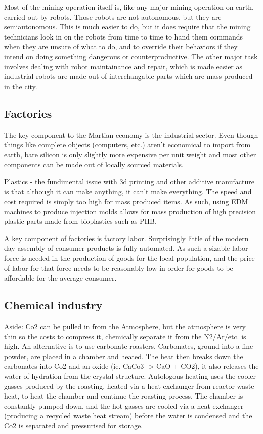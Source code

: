 \documentclass[10pt]{article}
\begin{document}
Most of the mining operation itself is, like any major mining operation on earth, carried out by robots. Those robots are not autonomous, but they are semiautonomous. This is much easier to do, but it does require that the mining technicians look in on the robots from time to time to hand them commands when they are unsure of what to do, and to override their behaviors if they intend on doing something dangerous or counterproductive. The other major task involves dealing with robot maintainance and repair, which is made easier as industrial robots are made out of interchangable parts which are mass produced in the city. 

\subsection{Factories}
The key component to the Martian economy is the industrial sector. Even though things like complete objects (computers, etc.) aren't economical to import from earth, bare silicon is only slightly more expensive per unit weight and most other components can be made out of locally sourced materials. 

Plastics - the fundimental issue with 3d printing and other additive manufacture is that although it can make anything, it can't make everything. The speed and cost required is simply too high for mass produced items. As such, using EDM machines to produce injection molds allows for mass production of high precision plastic parts made from bioplastics such as PHB.

A key component of factories is factory labor. Surprisingly little of the modern day assembly of consumer products is fully automated. As such a sizable labor force is needed in the production of goods for the local population, and the price of labor for that force needs to be reasonably low in order for goods to be affordable for the average consumer.


\subsection*{Chemical industry}
Aside:
Co2 can be pulled in from the Atmosphere, but the atmosphere is very thin so the costs to compress it, chemically separate it from the N2/Ar/etc. is high. An alternative is to use carbonate roasters. Carbonates, ground into a fine powder, are placed in a chamber and heated. The heat then breaks down the carbonates into Co2 and an oxide (ie. CaCo3 -> CaO + CO2), it also releases the water of hydration from the crystal structure. Autologous heating uses the cooler gasses produced by the roasting, heated via a heat exchanger from reactor waste heat, to heat the chamber and continue the roasting process. The chamber is constantly pumped down, and the hot gasses are cooled via a heat exchanger (producing a recycled waste heat stream) before the water is condensed and the Co2 is separated and pressurised for storage.
\end{document}
